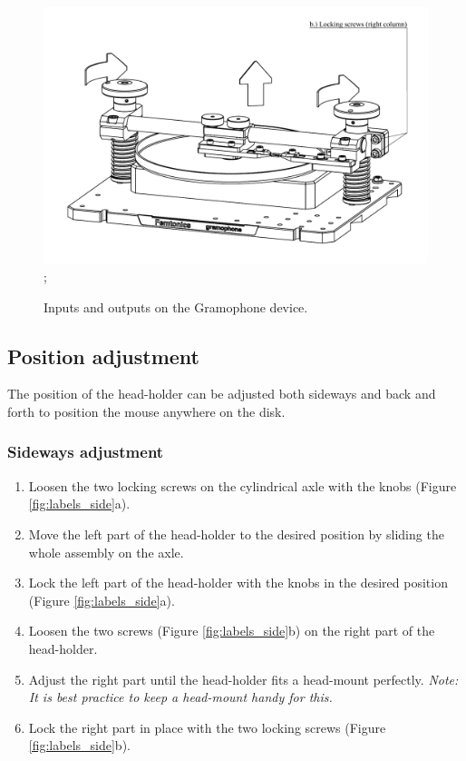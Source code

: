 \documentclass[11pt,a4paper]{article}
\newcommand{\note}[1]{\textit{Note: {#1}}}
\begin{document}
\begin{figure}[H] %
\centering
\includegraphics[clip, trim=1cm 1cm 0cm 0cm, width=1.00\textwidth]{labels_height_2.PDF};
\caption{Inputs and outputs on the Gramophone device.}
\label{fig:gram_height_2}
\end{figure}



\subsection{Position adjustment}
The position of the head-holder can be adjusted both sideways and back and forth to position the mouse anywhere on the disk.

\subsubsection{Sideways adjustment}
\begin{enumerate}
\item Loosen the two locking screws on the cylindrical axle with the knobs (Figure \ref{fig:labels_side}a).
\item Move the left part of the head-holder to the desired position by sliding the whole assembly on the axle.
\item Lock the left part of the head-holder with the knobs in the desired position (Figure \ref{fig:labels_side}a).
\item Loosen the two screws (Figure \ref{fig:labels_side}b) on the right part of the head-holder.
\item Adjust the right part until the head-holder fits a head-mount perfectly. \note{It is best practice to keep a head-mount handy for this.}
\item Lock the right part in place with the two locking screws (Figure \ref{fig:labels_side}b).
\end{enumerate}
\end{document}
